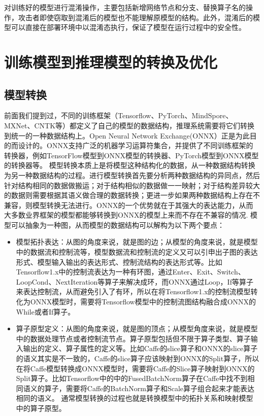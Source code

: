 \documentclass[letterpaper,10pt,english]{sphinxmanual}
\begin{document}
\sphinxAtStartPar
对训练好的模型进行混淆操作，主要包括新增网络节点和分支、替换算子名的操作，攻击者即使窃取到混淆后的模型也不能理解原模型的结构。此外，混淆后的模型可以直接在部署环境中以混淆态执行，保证了模型在运行过程中的安全性。


\section{训练模型到推理模型的转换及优化}
\label{\detokenize{chapter_model_deployment/model_converter_and_optimizer:id1}}\label{\detokenize{chapter_model_deployment/model_converter_and_optimizer::doc}}

\subsection{模型转换}
\label{\detokenize{chapter_model_deployment/model_converter_and_optimizer:id2}}
\sphinxAtStartPar
前面我们提到过，不同的训练框架（Tensorflow、PyTorch、MindSpore、MXNet、CNTK等）都定义了自己的模型的数据结构，推理系统需要将它们转换到统一的一种数据结构上。Open
Neural Network
Exchange(ONNX）正是为此目的而设计的。ONNX支持广泛的机器学习运算符集合，并提供了不同训练框架的转换器，例如TensorFlow模型到ONNX模型的转换器、PyTorch模型到ONNX模型的转换器等。
模型转换本质上是将模型这种结构化的数据，从一种数据结构转换为另一种数据结构的过程。进行模型转换首先要分析两种数据结构的异同点，然后针对结构相同的数据做搬运；对于结构相似的数据做一一映射；对于结构差异较大的数据则需要根据其语义做合理的数据转换；更进一步如果两种数据结构上存在不兼容，则模型转换无法进行。ONNX的一个优势就在于其强大的表达能力，从而大多数业界框架的模型都能够转换到ONNX的模型上来而不存在不兼容的情况.
模型可以抽象为一种图，从而模型的数据结构可以解构为以下两个要点：
\begin{itemize}
\item {} 
\sphinxAtStartPar
模型拓扑表达：从图的角度来说，就是图的边；从模型的角度来说，就是模型中的数据流和控制流等，模型数据流和控制流的定义又可以引申出子图的表达形式、模型输入输出的表达形式、控制流结构的表达形式等。比如Tensorflow1.x中的控制流表达为一种有环图，通过Enter、Exit、Switch、LoopCond、NextIteration等算子来解决成环，而ONNX通过Loop，If等算子来表达控制流，从而避免引入了有环，所以在将Tensorflow1.x的控制流模型转化为ONNX模型时，需要将Tensorflow模型中的控制流图结构融合成ONNX的While或者If算子。

\item {} 
\sphinxAtStartPar
算子原型定义：从图的角度来说，就是图的顶点；从模型角度来说，就是模型中的数据处理节点或者控制流节点。算子原型包括但不限于算子类型、算子输入输出的定义、算子属性的定义等。比如Caffe的slice算子和ONNX的slice算子的语义其实是不一致的，Caffe的slice算子应该映射到ONNX的Split算子，所以在将Caffe模型转换成ONNX模型时，需要将Caffe的Slice算子映射到ONNX的Split算子。比如Tensorflow中的中的FusedBatchNorm算子在Caffe中找不到相同语义的算子，需要将Caffe的BatchNorm算子和Scale算子组合起来才能表达相同的语义。
通常模型转换的过程也就是转换模型中的拓扑关系和映射模型中的算子原型。

\end{itemize}
\end{document}
